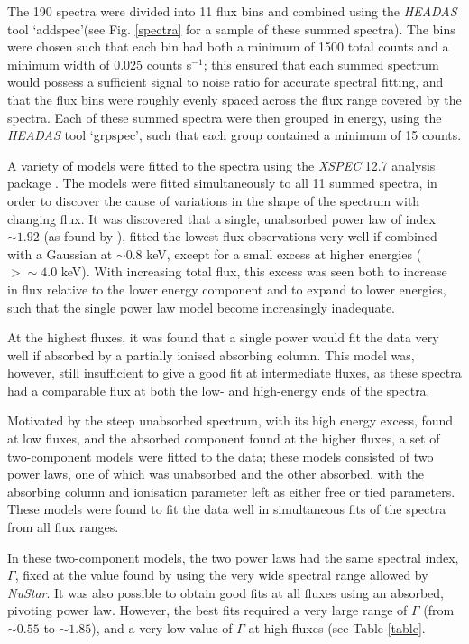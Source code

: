 \documentclass[useAMS,usenatbib]{sam}
\begin{document}

The 190 spectra were divided into 11 flux bins and combined using the {\it HEADAS} tool `addspec'(see Fig. \ref{spectra} for a sample of these summed spectra). The bins
were chosen such that each bin had both a minimum of 1500 total counts and a minimum width of 0.025 counts s$^{-1}$; this ensured that each summed spectrum would possess
a sufficient signal to noise ratio for accurate spectral fitting, and that the flux bins were roughly evenly spaced across the flux range covered by the spectra. Each of
these summed spectra were then grouped in energy, using the {\it HEADAS} tool `grpspec', such that each group contained a minimum of 15 counts.

A variety of models were fitted to the spectra using the {\it XSPEC} 12.7 analysis package \citep{arnaud}. The models were fitted simultaneously to all 11 summed
spectra, in order to discover the cause of variations in the shape of the spectrum with changing flux.  It was discovered that a single, unabsorbed power law of index
$\sim 1.92$ (as found by \citet{risaliti13}), fitted the lowest flux observations very well if combined with a Gaussian at $\sim 0.8$ keV, except for a small excess at
higher energies ($> \sim 4.0$ keV). With increasing total flux, this excess was seen both to increase in flux relative to the lower energy component and to expand to
lower energies, such that the single power law model become increasingly inadequate. 

At the highest fluxes, it was found that a single power would fit the data very well if absorbed by a partially ionised absorbing column. This model was, however, still
insufficient to give a good fit at intermediate fluxes, as these spectra had a comparable flux at both the low- and high-energy ends of the spectra.

Motivated by the steep unabsorbed spectrum, with its high energy excess, found at low fluxes, and the absorbed component found at the higher fluxes, a set of
two-component models were fitted to the data; these models consisted of two power laws, one of which was unabsorbed and the other absorbed, with the absorbing column and
ionisation parameter left as either free or tied parameters. These models were found to fit the data well in simultaneous fits of the spectra from all flux ranges.

In these two-component models, the two power laws had the same spectral index, $\Gamma$, fixed at the value found by \citet{risaliti13} using the very wide spectral
range allowed by {\it NuStar}. It was also possible to obtain good fits at all fluxes using an absorbed, pivoting power law. However, the best fits required a very large
range of $\Gamma$ (from $\sim 0.55$ to $\sim 1.85$), and a very low value of $\Gamma$ at high fluxes (see Table \ref{table}.
\end{document}

